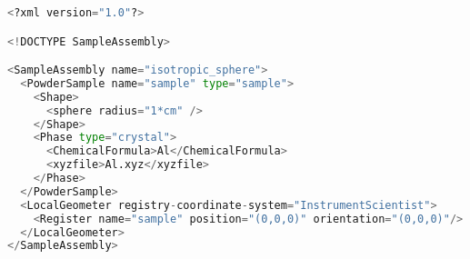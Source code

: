 \begin{lstlisting}[language=python]
<?xml version="1.0"?>

<!DOCTYPE SampleAssembly>

<SampleAssembly name="isotropic_sphere">
  <PowderSample name="sample" type="sample">
    <Shape>
      <sphere radius="1*cm" />
    </Shape>
    <Phase type="crystal">
      <ChemicalFormula>Al</ChemicalFormula>
      <xyzfile>Al.xyz</xyzfile>
    </Phase>
  </PowderSample>
  <LocalGeometer registry-coordinate-system="InstrumentScientist">
    <Register name="sample" position="(0,0,0)" orientation="(0,0,0)"/>
  </LocalGeometer>
</SampleAssembly>
\end{lstlisting}
